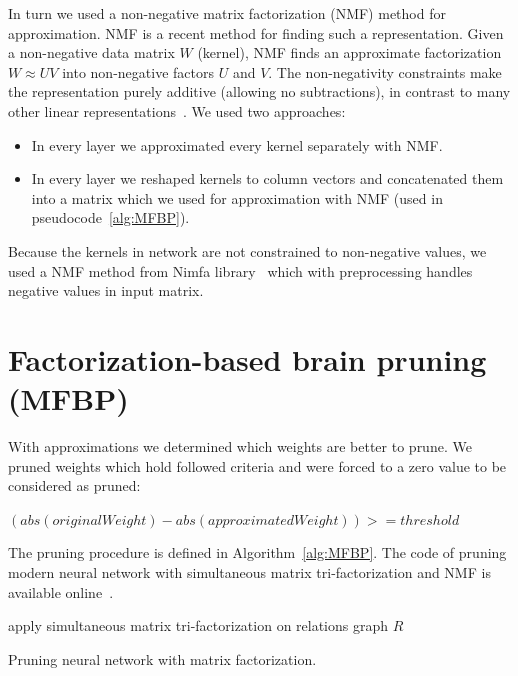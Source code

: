 \documentclass{article} %
\begin{document}
In turn we used a non-negative matrix factorization (NMF) method 
for approximation. NMF is
a recent method for finding such a representation. Given a non-negative data 
matrix $W$ (kernel), NMF finds
an approximate factorization $W \approx UV$ into non-negative factors $U$ and 
$V$. The non-negativity
constraints make the representation purely additive (allowing no subtractions), 
in contrast to many
other linear representations~\cite{hoyer2004non}. We used two approaches:
\begin{itemize}
\item In every layer we approximated every kernel separately with NMF. 
\item In every layer we reshaped 
kernels to column vectors and concatenated them into a matrix which we used for 
approximation with NMF (used in pseudocode~\ref{alg:MFBP}).
\end{itemize} Because the kernels in network are not constrained to non-negative 
values, we used a NMF method from Nimfa 
library~\citep{Zitnik2012} which with preprocessing handles negative values in 
input matrix.


\section{Factorization-based brain pruning (MFBP)}
With approximations we determined which weights are better to prune. We pruned
weights which hold followed criteria and were forced to a zero value to be
considered as pruned:

$(abs(originalWeight) - abs(approximatedWeight)) >= threshold$

The pruning procedure is defined in Algorithm~\ref{alg:MFBP}.
The code of pruning modern neural network with simultaneous matrix 
tri-factorization and NMF is available online~\cite{code}.

\begin{algorithm}[H]
\label{alg:MFBP}
 apply simultaneous matrix tri-factorization on relations graph $R$\;
 \caption{Pruning neural network with matrix factorization.}
 
\end{algorithm}
\end{document}
